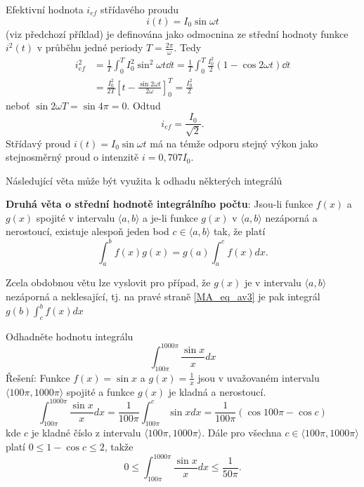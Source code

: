   \begin{example} Efektivní hodnota $i_{ef}$ střídavého proudu $$i(t) = I_0\sin\omega t$$ (viz
    předchozí příklad) je definována jako odmocnina ze střední hodnoty funkce $i^2(t)$ v průběhu
    jedné periody $T = \frac{2\pi}{\omega}$. Tedy
    \begin{align*}
      i_{ef}^2 &= \frac{1}{T}\int_0^T I_0^2\sin^2\omega t\dd{t} = 
                  \frac{1}{T}\int_0^T \frac{I_0^2}{2}(1- \cos2\omega t)\dd{t}           \\
               &= \frac{I_0^2}{2T}
                  \left[
                    t-\frac{\sin2\omega t}{2\omega}
                  \right]_0^T = \frac{I_0^2}{2}
    \end{align*}
    neboť $\sin2\omega T=\sin4\pi = 0.$ Odtud $$i_{ef} = \frac{I_0}{\sqrt{2}}.$$ Střídavý proud
    $i(t) = I_0\sin\omega t$ má na témže odporu stejný výkon jako stejnosměrný proud o intenzitě
    $i = 0,707I_0$.
  \end{example}
  Následující věta může být využita k odhadu některých integrálů
  \begin{lemma}
    \textbf{Druhá věta o střední hodnotě integrálního počtu}: Jsou-li funkce $f(x)$ a $g(x)$
    spojité v intervalu $\langle a, b \rangle$ a je-li funkce $g(x)$ v $\langle a, b \rangle$
    nezáporná a nerostoucí, existuje alespoň jeden bod $c\in\langle a, b \rangle$ tak, že platí
    \begin{equation}\label{MA_eq_av3}
        \int_a^b f(x)g(x) = g(a)\int_a^c f(x)dx.
    \end{equation}
  \end{lemma}
  Zcela obdobnou větu lze vyslovit pro případ, že $g(x)$ je v intervalu $\langle a, b \rangle$
  nezáporná a neklesající, tj. na pravé straně \ref{MA_eq_av3} je pak integrál $g(b)\int_c^b
  f(x)dx$

  \begin{example} Odhadněte hodnotu integrálu
    \begin{equation}\label{MA_eq_sinx_x}
        \int_{100\pi}^{1000\pi}\frac{\sin x}{x}dx
    \end{equation}
    Řešení: Funkce $f(x) = \sin x$ a $g(x) = \frac{1}{x}$ jsou v uvažovaném intervalu $\langle
    100\pi, 1000\pi \rangle$ spojité a funkce $g(x)$ je kladná a nerostoucí.
    \begin{equation*}
      \int_{100\pi}^{1000\pi}\frac{\sin x}{x}dx = 
      \frac{1}{100\pi}\int_{100\pi}^c\sin xdx =\frac{1}{100\pi}\left(\cos100\pi - \cos c\right)
    \end{equation*}
    kde $c$ je kladné číslo z intervalu $\langle 100\pi, 1000\pi \rangle$. Dále pro všechna
    $c\in\langle 100\pi, 1000\pi \rangle$ platí $0\leq1-\cos c\leq2$, takže
    \begin{equation*}
        0\leq\int_{100\pi}^{1000\pi}\frac{\sin x}{x}dx\leq \frac{1}{50\pi}.
    \end{equation*}
  \end{example}   
\printbibliography[heading=subbibliography]
